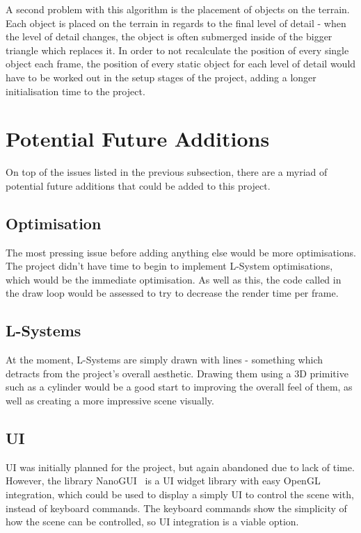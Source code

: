 \documentclass[a4paper,10pt]{report}
\begin{document}
A second problem with this algorithm is the placement of objects on the terrain. Each object is placed on the terrain in regards to the final level of detail - when the level of detail changes, the object is often submerged inside of the bigger triangle which replaces it. In order to not recalculate the position of every single object each frame, the position of every static object for each level of detail would have to be worked out in the setup stages of the project, adding a longer initialisation time to the project. 

\section{Potential Future Additions}

On top of the issues listed in the previous subsection, there are a myriad of potential future additions that could be added to this project. 

\subsection{Optimisation}
The most pressing issue before adding anything else would be more optimisations. The project didn't have time to begin to implement L-System optimisations, which would be the immediate optimisation. As well as this, the code called in the draw loop would be assessed to try to decrease the render time per frame.  

\subsection{L-Systems}
At the moment, L-Systems are simply drawn with lines - something which detracts from the project's overall aesthetic. Drawing them using a 3D primitive such as a cylinder would be a good start to improving the overall feel of them, as well as creating a more impressive scene visually. 

\subsection{UI}

UI was initially planned for the project, but again abandoned due to lack of time. However, the library NanoGUI~\cite{nanogui} is a UI widget library with easy OpenGL integration, which could be used to display a simply UI to control the scene with, instead of keyboard commands. The keyboard commands show the simplicity of how the scene can be controlled, so UI integration is  a viable option.
\end{document}
